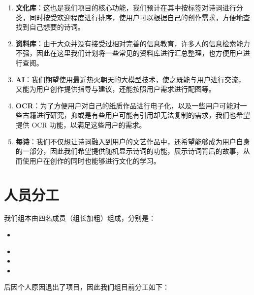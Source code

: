 \documentclass[
    UTF8,
    12pt,
    oneside,
    a4paper
]{ctexart}
\begin{document}
\begin{enumerate}
    \item \textbf{文化库}：这也是我们项目的核心功能，我们预计在其中按标签对诗词进行分类，同时按受欢迎程度进行排序，使用户可以根据自己的创作需求，方便地查找到自己想要的诗词。
    \item \textbf{资料库}：由于大众并没有接受过相对完善的信息教育，许多人的信息检索能力不强，因此在这里我们计划将一些常见的资料库进行汇总整理，也方便用户进行查阅。
    \item \textbf{AI}：我们期望使用最近热火朝天的大模型技术，使之既能与用户进行交流，又能为用户创作提供指导与建议，还能按照用户需求进行配图等。
    \item \textbf{OCR}：为了方便用户对自己的纸质作品进行电子化，以及一些用户可能对一些古籍进行研究，抑或是有些用户可能有引用却无法复制的需求，我们也希望提供 OCR 功能，以满足这些用户的需求。
    \item \textbf{每诗}：我们不仅想让诗词融入到用户的文艺作品中，还希望能够成为用户自身的一部分，因此我们希望提供随机显示诗词的功能，展示诗词背后的故事，从而使用户在创作的同时也能够进行文化的学习。
\end{enumerate}

\section{人员分工}

我们组本由四名成员（组长加粗）组成，分别是：

\begin{itemize}
    \item \textbf{\wo}
    \item \vi
    \item \rr
    \item \tv
\end{itemize}

后{\tv}因个人原因退出了项目，因此我们组目前分工如下：
\end{document}
